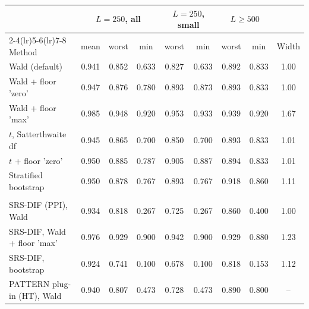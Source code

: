 \begin{tabular}{lcccccccc}
\toprule
 & \multicolumn{3}{c}{$L=250$, all} & \multicolumn{2}{c}{$L=250$, small} & \multicolumn{2}{c}{$L\ge 500$} & \\
\cmidrule(lr){2-4}\cmidrule(lr){5-6}\cmidrule(lr){7-8}
Method & mean & worst & min & worst & min & worst & min & Width \\
\midrule
Wald (default) & 0.941 & 0.852 & 0.633 & 0.827 & 0.633 & 0.892 & 0.833 & 1.00 \\
Wald + floor 'zero' & 0.947 & 0.876 & 0.780 & 0.893 & 0.873 & 0.893 & 0.833 & 1.00 \\
Wald + floor 'max' & 0.985 & 0.948 & 0.920 & 0.953 & 0.933 & 0.939 & 0.920 & 1.67 \\
$t$, Satterthwaite df & 0.945 & 0.865 & 0.700 & 0.850 & 0.700 & 0.893 & 0.833 & 1.01 \\
$t$ + floor 'zero' & 0.950 & 0.885 & 0.787 & 0.905 & 0.887 & 0.894 & 0.833 & 1.01 \\
Stratified bootstrap & 0.950 & 0.878 & 0.767 & 0.893 & 0.767 & 0.918 & 0.860 & 1.11 \\
\addlinespace
\multicolumn{9}{l}{\emph{References}} \\
SRS-DIF (PPI), Wald & 0.934 & 0.818 & 0.267 & 0.725 & 0.267 & 0.860 & 0.400 & 1.00 \\
SRS-DIF, Wald + floor 'max' & 0.976 & 0.929 & 0.900 & 0.942 & 0.900 & 0.929 & 0.880 & 1.23 \\
SRS-DIF, bootstrap & 0.924 & 0.741 & 0.100 & 0.678 & 0.100 & 0.818 & 0.153 & 1.12 \\
PATTERN plug-in (HT), Wald & 0.940 & 0.807 & 0.473 & 0.728 & 0.473 & 0.890 & 0.800 & -- \\
\bottomrule
\end{tabular}
